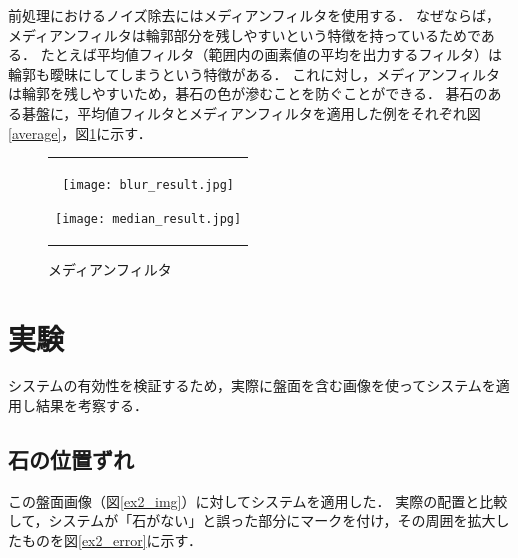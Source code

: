 \documentclass[summary]{nitocs}
\numberwithin{equation}{section}
\begin{document}
        前処理におけるノイズ除去にはメディアンフィルタを使用する．
        なぜならば，メディアンフィルタは輪郭部分を残しやすいという特徴を持っているためである．
        たとえば平均値フィルタ（範囲内の画素値の平均を出力するフィルタ）は輪郭も曖昧にしてしまうという特徴がある．
        これに対し，メディアンフィルタは輪郭を残しやすいため，碁石の色が滲むことを防ぐことができる．
        碁石のある碁盤に，平均値フィルタとメディアンフィルタを適用した例をそれぞれ図\ref{average}，図\ref{median}に示す．
        \begin{figure}[tb] %
            \begin{center}
              \begin{tabular}{c}
                \begin{minipage}{0.5\hsize}
                  \begin{center}
                    \texttt{[image: blur\_result.jpg]}
                \caption{平均値フィルタ}
                \label{average}
                  \end{center}
                \end{minipage}
                \begin{minipage}{0.5\hsize}
                  \begin{center}
                    \texttt{[image: median\_result.jpg]}
                \caption{メディアンフィルタ}
                \label{median}
                  \end{center}
                \end{minipage}
              \end{tabular}
            \end{center}
        \end{figure}



    \section{実験} \label{experiment}
        システムの有効性を検証するため，実際に盤面を含む画像を使ってシステムを適用し結果を考察する．
        \subsection{石の位置ずれ} \label{ex2}%
            この盤面画像（図\ref{ex2_img}）に対してシステムを適用した．
            実際の配置と比較して，システムが「石がない」と誤った部分にマークを付け，その周囲を拡大したものを図\ref{ex2_error}に示す．
\end{document}
